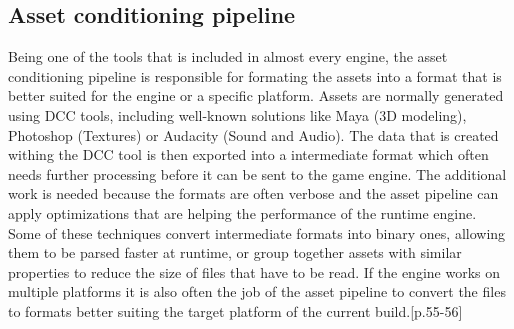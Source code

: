 \subsection{Asset conditioning pipeline}

Being one of the tools that is included in almost every engine, the asset conditioning pipeline is responsible for formating the assets into a format that is better suited for the engine or a specific platform. Assets are normally generated using \ac{DCC} tools, including well-known solutions like Maya (3D modeling), Photoshop (Textures) or Audacity (Sound and Audio). The data that is created withing the \ac{DCC} tool is then exported into a intermediate format which often needs further processing before it can be sent to the game engine. The additional work is needed because the formats are often verbose and the asset pipeline can apply optimizations that are helping the performance of the runtime engine. Some of these techniques convert intermediate formats into binary ones, allowing them to be parsed faster at runtime, or group together assets with similar properties to reduce the size of files that have to be read. If the engine works on multiple platforms it is also often the job of the asset pipeline to convert the files to formats better suiting the target platform of the current build.\cite{GEA_2}[p.55-56]
